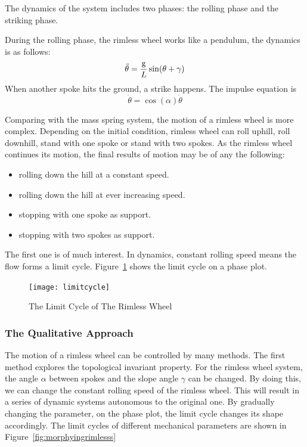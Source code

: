 The dynamics of the system includes two phases: the rolling phase and the striking phase.

During the rolling phase, the rimless wheel works like a pendulum, the dynamics is as follows:
\[
\ddot{\theta}=\frac{\mathrm{g}}{L}\sin(\theta+\gamma)
\]
When another spoke hits the ground, a strike happens. The impulse equation is
\[
\dot{\theta}=\cos(\alpha)\dot{\theta}
\] 

Comparing with the mass spring system, the motion of a rimless wheel is more complex. 
Depending on the initial condition, rimless wheel can roll uphill, roll downhill, stand with one spoke or stand with two spokes.
As the rimless wheel continues its motion, the final results of motion may be of any the following:
\begin{itemize}
\item rolling down the hill at a constant speed.
\item rolling down the hill at ever increasing speed.
\item stopping with one spoke as support.
\item stopping with two spokes as support.
\end{itemize}
The first one is of much interest.
In dynamics, constant rolling speed means the flow forms a limit cycle.
Figure~\ref{fig:lcofrimlesswheel} shows the limit cycle on a phase plot.
\begin{figure}[!htbp]
  \begin{center}
     \texttt{[image: limitcycle]}
    \caption{The Limit Cycle of The Rimless Wheel}
    \label{fig:lcofrimlesswheel}  
  \end{center}
\end{figure}




\subsubsection*{The Qualitative Approach}
The motion of a rimless wheel can be controlled by many methods.
The first method explores the topological invariant property.
For the rimless wheel system, the angle $\alpha$ between spokes and the slope angle $\gamma$ can be changed.
By doing this, we can change the constant rolling speed of the rimless wheel.
This will result in  a series of dynamic systems autonomous to the original one.
By gradually changing the parameter, on the phase plot, the limit cycle changes its shape accordingly.
The limit cycles of different mechanical parameters are shown in Figure~\ref{fig:morphyingrimlesss}

